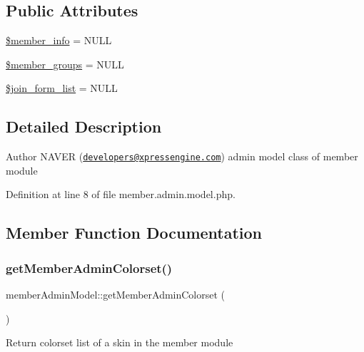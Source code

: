 \subsection*{Public Attributes}
\begin{DoxyCompactItemize}
\item 
\hyperlink{classmemberAdminModel_a4d4a6cc79e642c4dfabcf5f6666991b2}{\$member\+\_\+info} = N\+U\+LL
\item 
\hyperlink{classmemberAdminModel_a4147285c4d6a90b6d73c2d4f2b974b3b}{\$member\+\_\+groups} = N\+U\+LL
\item 
\hyperlink{classmemberAdminModel_a24bd367796a7bc111c649ce71502f30d}{\$join\+\_\+form\+\_\+list} = N\+U\+LL
\end{DoxyCompactItemize}


\subsection{Detailed Description}
\begin{DoxyAuthor}{Author}
N\+A\+V\+ER (\href{mailto:developers@xpressengine.com}{\tt developers@xpressengine.\+com}) admin model class of member module 
\end{DoxyAuthor}


Definition at line 8 of file member.\+admin.\+model.\+php.



\subsection{Member Function Documentation}
\hypertarget{classmemberAdminModel_a3f52ba31859fdc224dd0ac50495e450c}{}\label{classmemberAdminModel_a3f52ba31859fdc224dd0ac50495e450c} 
\subsubsection{\texorpdfstring{get\+Member\+Admin\+Colorset()}{getMemberAdminColorset()}}
{\footnotesize\ttfamily member\+Admin\+Model\+::get\+Member\+Admin\+Colorset (\begin{DoxyParamCaption}{ }\end{DoxyParamCaption})}

Return colorset list of a skin in the member module

